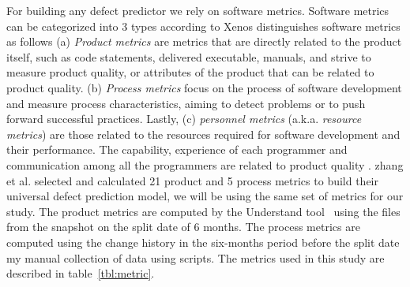 \documentclass[sigconf,review]{acmart}
\theoremstyle{break}
\begin{document}
For building any defect predictor we rely on software metrics. Software metrics can be categorized into 3 types according to Xenos \cite{Xenos} distinguishes software metrics as  follows (a) {\em Product metrics} are metrics that are directly related to the product itself, such as code statements, delivered executable, manuals, and strive to measure product quality, or attributes of the product that can be related to product quality. (b) {\em Process metrics} focus on the process of software development and measure process characteristics, aiming to detect problems or to push forward successful practices. Lastly, (c) {\em personnel metrics} (a.k.a. {\em resource metrics}) are those related to the resources required for software development and their performance. The capability, experience of each programmer and communication among all the programmers are related to product quality \cite{wolf2009predicting,de2004sometimes,cataldo2013coordination,cataldo2007coordination}. zhang et al. selected and calculated 21 product and 5 process metrics to build their universal defect prediction model, we will be using the same set of metrics for our study. The product metrics are computed by the Understand tool~\cite{visualize} using the files from the snapshot on the split date of 6 months. The process metrics are computed using the change history in the six-months period before the split date my manual collection of data using scripts. The metrics used in this study are described in table~\ref{tbl:metric}.
\end{document}
